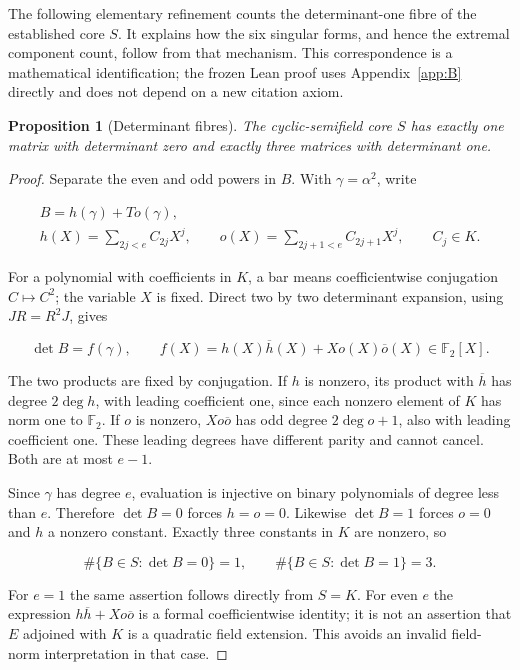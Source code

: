 \documentclass[11pt,a4paper]{article}
\newcommand{\F}{\mathbb F}
\newtheorem{proposition}[theorem]{Proposition}
\theoremstyle{definition}
\begin{document}
The following elementary refinement counts the determinant-one fibre of the established core $S$. It explains how the six singular forms, and hence the extremal component count, follow from that mechanism. This correspondence is a mathematical identification; the frozen Lean proof uses Appendix~\ref{app:B} directly and does not depend on a new citation axiom.


\begin{proposition}[Determinant fibres]\label{prop:fibres}The cyclic-semifield core $S$ has exactly one matrix with determinant zero and exactly three matrices with determinant one.\end{proposition}\begin{proof}

Separate the even and odd powers in $B$. With $\gamma =\alpha ^{2}$, write


\begin{equation}\label{eq:190}
\begin{gathered}B=h(\gamma)+To(\gamma),\\h(X)=\sum_{2j<e}C_{2j}X^j,\qquad o(X)=\sum_{2j+1<e}C_{2j+1}X^j,\qquad C_j\in K.\end{gathered}
\end{equation}

For a polynomial with coefficients in $K$, a bar means coefficientwise conjugation $C\mapsto C^{2}$; the variable $X$ is fixed. Direct two by two determinant expansion, using $JR=R^{2}J$, gives


\begin{equation}\label{eq:192}
\det B=f(\gamma),\qquad f(X)=h(X)\overline h(X)+Xo(X)\overline o(X)\in\F_2[X].
\end{equation}

The two products are fixed by conjugation. If $h$ is nonzero, its product with $\overline h$ has degree $2\deg h$, with leading coefficient one, since each nonzero element of $K$ has norm one to $\F_{2}$. If $o$ is nonzero, $Xo\overline o$ has odd degree $2\deg o+1$, also with leading coefficient one. These leading degrees have different parity and cannot cancel. Both are at most $e-1$.


Since $\gamma $ has degree $e$, evaluation is injective on binary polynomials of degree less than $e$. Therefore $\operatorname{det} B=0$ forces $h=o=0$. Likewise $\operatorname{det} B=1$ forces $o=0$ and $h$ a nonzero constant. Exactly three constants in $K$ are nonzero, so


\begin{equation}\label{eq:195}
\#\{B\in S:\det B=0\}=1,\qquad\#\{B\in S:\det B=1\}=3.
\end{equation}

For $e=1$ the same assertion follows directly from $S=K$. For even $e$ the expression $h\overline h+Xo\overline o$ is a formal coefficientwise identity; it is not an assertion that $E$ adjoined with $K$ is a quadratic field extension. This avoids an invalid field-norm interpretation in that case.


\end{proof}
\end{document}
